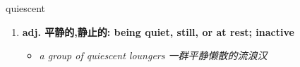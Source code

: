 
\begin{frame}
{\huge quiescent}
\begin{center}
\begin{enumerate}\Large
  \item \textbf{adj. 平静的,静止的: being quiet, still, or at rest; inactive}
  \begin{itemize}
    \item \em{\Large{a group of quiescent loungers 一群平静懒散的流浪汉}}
  \end{itemize}
\end{enumerate}
\end{center}
\end{frame}
